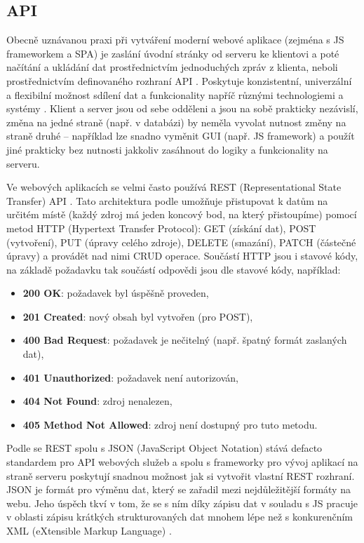         \subsection{API}\label{api}
        Obecně uznávanou praxi při vytváření moderní webové aplikace (zejména s JS frameworkem a SPA) je zaslání úvodní stránky od serveru ke klientovi a poté načítání a ukládání dat prostřednictvím jednoduchých zpráv z klienta, neboli prostřednictvím definovaného rozhraní API \cite{api1}. 
        Poskytuje konzistentní, univerzální a flexibilní možnost sdílení dat a funkcionality napříč různými technologiemi a systémy \cite{api2}. Klient a server jsou od sebe odděleni a jsou na sobě prakticky nezávislí, změna na jedné straně (např. v databázi) by neměla vyvolat nutnost změny na straně druhé \cite{api3} -- například lze snadno vyměnit GUI (např. JS framework) a použít jiné prakticky bez nutnosti jakkoliv zasáhnout do logiky a funkcionality na serveru.
        
        Ve webových aplikacích se velmi často používá REST (Representational State Transfer) API \cite{api1}. Tato architektura podle \cite{api4} umožňuje přistupovat k datům na určitém místě (každý zdroj má jeden koncový bod, na který přistoupíme) pomocí metod HTTP (Hypertext Transfer Protocol): GET (získání dat), POST (vytvoření), PUT (úpravy celého zdroje), DELETE (smazání), PATCH (částečné úpravy) a provádět nad nimi CRUD operace. Součástí HTTP jsou i stavové kódy, na základě požadavku tak součástí odpovědi jsou dle \cite{api4} stavové kódy, například:
            \begin{itemize}
                \item \textbf{200 OK}: požadavek byl úspěšně proveden,
                \item \textbf{201 Created}: nový obsah byl vytvořen (pro POST),
                \item \textbf{400 Bad Request}: požadavek je nečitelný (např. špatný formát zaslaných dat),
                \item \textbf{401 Unauthorized}: požadavek není autorizován,
                \item \textbf{404 Not Found}: zdroj nenalezen,
                \item \textbf{405 Method Not Allowed}: zdroj není dostupný pro tuto metodu.
            \end{itemize}
        Podle \cite{api5} se REST spolu s JSON (JavaScript Object Notation) stává defacto standardem pro API webových služeb a spolu s frameworky pro vývoj aplikací na straně serveru poskytují snadnou možnost jak si vytvořit vlastní REST rozhraní. JSON je formát pro výměnu dat, který se zařadil mezi nejdůležitější formáty na webu. Jeho úspěch tkví v tom, že se s ním díky zápisu dat v souladu s JS pracuje v oblasti zápisu krátkých strukturovaných dat mnohem lépe než s konkurenčním XML (eXtensible Markup Language) \cite{api6}.
        
